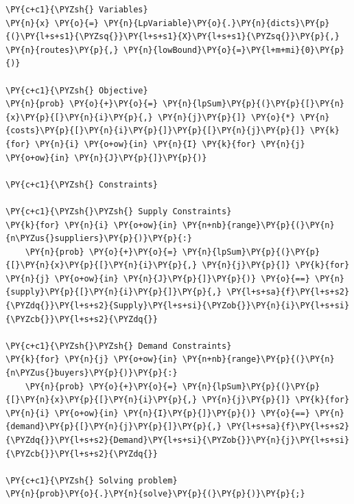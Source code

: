 \begin{tcolorbox}[breakable, size=fbox, boxrule=1pt, pad at break*=1mm,colback=cellbackground, colframe=cellborder]
\begin{Verbatim}[commandchars=\\\{\}]
\PY{c+c1}{\PYZsh{} Variables}
\PY{n}{x} \PY{o}{=} \PY{n}{LpVariable}\PY{o}{.}\PY{n}{dicts}\PY{p}{(}\PY{l+s+s1}{\PYZsq{}}\PY{l+s+s1}{X}\PY{l+s+s1}{\PYZsq{}}\PY{p}{,} \PY{n}{routes}\PY{p}{,} \PY{n}{lowBound}\PY{o}{=}\PY{l+m+mi}{0}\PY{p}{)}

\PY{c+c1}{\PYZsh{} Objective}
\PY{n}{prob} \PY{o}{+}\PY{o}{=} \PY{n}{lpSum}\PY{p}{(}\PY{p}{[}\PY{n}{x}\PY{p}{[}\PY{n}{i}\PY{p}{,} \PY{n}{j}\PY{p}{]} \PY{o}{*} \PY{n}{costs}\PY{p}{[}\PY{n}{i}\PY{p}{]}\PY{p}{[}\PY{n}{j}\PY{p}{]} \PY{k}{for} \PY{n}{i} \PY{o+ow}{in} \PY{n}{I} \PY{k}{for} \PY{n}{j} \PY{o+ow}{in} \PY{n}{J}\PY{p}{]}\PY{p}{)}

\PY{c+c1}{\PYZsh{} Constraints}

\PY{c+c1}{\PYZsh{}\PYZsh{} Supply Constraints}
\PY{k}{for} \PY{n}{i} \PY{o+ow}{in} \PY{n+nb}{range}\PY{p}{(}\PY{n}{n\PYZus{}suppliers}\PY{p}{)}\PY{p}{:}
    \PY{n}{prob} \PY{o}{+}\PY{o}{=} \PY{n}{lpSum}\PY{p}{(}\PY{p}{[}\PY{n}{x}\PY{p}{[}\PY{n}{i}\PY{p}{,} \PY{n}{j}\PY{p}{]} \PY{k}{for} \PY{n}{j} \PY{o+ow}{in} \PY{n}{J}\PY{p}{]}\PY{p}{)} \PY{o}{==} \PY{n}{supply}\PY{p}{[}\PY{n}{i}\PY{p}{]}\PY{p}{,} \PY{l+s+sa}{f}\PY{l+s+s2}{\PYZdq{}}\PY{l+s+s2}{Supply}\PY{l+s+si}{\PYZob{}}\PY{n}{i}\PY{l+s+si}{\PYZcb{}}\PY{l+s+s2}{\PYZdq{}}
    
\PY{c+c1}{\PYZsh{}\PYZsh{} Demand Constraints}
\PY{k}{for} \PY{n}{j} \PY{o+ow}{in} \PY{n+nb}{range}\PY{p}{(}\PY{n}{n\PYZus{}buyers}\PY{p}{)}\PY{p}{:}
    \PY{n}{prob} \PY{o}{+}\PY{o}{=} \PY{n}{lpSum}\PY{p}{(}\PY{p}{[}\PY{n}{x}\PY{p}{[}\PY{n}{i}\PY{p}{,} \PY{n}{j}\PY{p}{]} \PY{k}{for} \PY{n}{i} \PY{o+ow}{in} \PY{n}{I}\PY{p}{]}\PY{p}{)} \PY{o}{==} \PY{n}{demand}\PY{p}{[}\PY{n}{j}\PY{p}{]}\PY{p}{,} \PY{l+s+sa}{f}\PY{l+s+s2}{\PYZdq{}}\PY{l+s+s2}{Demand}\PY{l+s+si}{\PYZob{}}\PY{n}{j}\PY{l+s+si}{\PYZcb{}}\PY{l+s+s2}{\PYZdq{}}
    
\PY{c+c1}{\PYZsh{} Solving problem}
\PY{n}{prob}\PY{o}{.}\PY{n}{solve}\PY{p}{(}\PY{p}{)}\PY{p}{;}
\end{Verbatim}
\end{tcolorbox}

